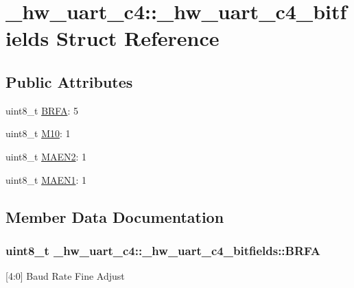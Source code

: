 \hypertarget{struct__hw__uart__c4_1_1__hw__uart__c4__bitfields}{}\section{\+\_\+hw\+\_\+uart\+\_\+c4\+:\+:\+\_\+hw\+\_\+uart\+\_\+c4\+\_\+bitfields Struct Reference}
\label{struct__hw__uart__c4_1_1__hw__uart__c4__bitfields}
\subsection*{Public Attributes}
\begin{DoxyCompactItemize}
\item 
uint8\+\_\+t \hyperlink{struct__hw__uart__c4_1_1__hw__uart__c4__bitfields_ad775bbffd61eb2e3ab6662715cb80905}{B\+R\+FA}\+: 5
\item 
uint8\+\_\+t \hyperlink{struct__hw__uart__c4_1_1__hw__uart__c4__bitfields_aa5fdc1d8d6883d8252a0677a585d104a}{M10}\+: 1
\item 
uint8\+\_\+t \hyperlink{struct__hw__uart__c4_1_1__hw__uart__c4__bitfields_a988db9de35f2e039cbbcfbe1d4b8e4dc}{M\+A\+E\+N2}\+: 1
\item 
uint8\+\_\+t \hyperlink{struct__hw__uart__c4_1_1__hw__uart__c4__bitfields_a637675cd39af95c369eceb3e505310d9}{M\+A\+E\+N1}\+: 1
\end{DoxyCompactItemize}


\subsection{Member Data Documentation}
\subsubsection[{\texorpdfstring{B\+R\+FA}{BRFA}}]{\setlength{\rightskip}{0pt plus 5cm}uint8\+\_\+t \+\_\+hw\+\_\+uart\+\_\+c4\+::\+\_\+hw\+\_\+uart\+\_\+c4\+\_\+bitfields\+::\+B\+R\+FA}\hypertarget{struct__hw__uart__c4_1_1__hw__uart__c4__bitfields_ad775bbffd61eb2e3ab6662715cb80905}{}\label{struct__hw__uart__c4_1_1__hw__uart__c4__bitfields_ad775bbffd61eb2e3ab6662715cb80905}
\mbox{[}4\+:0\mbox{]} Baud Rate Fine Adjust 
